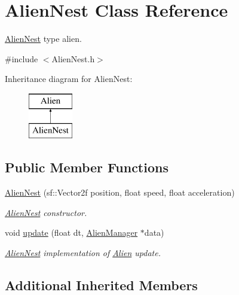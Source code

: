 \hypertarget{class_alien_nest}{}\section{Alien\+Nest Class Reference}
\label{class_alien_nest}


\hyperlink{class_alien_nest}{Alien\+Nest} type alien.  




{\ttfamily \#include $<$Alien\+Nest.\+h$>$}

Inheritance diagram for Alien\+Nest\+:\begin{figure}[H]
\begin{center}
\leavevmode
\includegraphics[height=2.000000cm]{class_alien_nest}
\end{center}
\end{figure}
\subsection*{Public Member Functions}
\begin{DoxyCompactItemize}
\item 
\mbox{\label{class_alien_nest_ad40eb25b1de5f065ef7d3cdd601847cb}} 
\hyperlink{class_alien_nest_ad40eb25b1de5f065ef7d3cdd601847cb}{Alien\+Nest} (sf\+::\+Vector2f position, float speed, float acceleration)
\begin{DoxyCompactList}\small\item\em \hyperlink{class_alien_nest}{Alien\+Nest} constructor. \end{DoxyCompactList}\item 
void \hyperlink{class_alien_nest_ac8d9fe5e35a8a049ae0be1b4f32bd403}{update} (float dt, \hyperlink{class_alien_manager}{Alien\+Manager} $\ast$data)
\begin{DoxyCompactList}\small\item\em \hyperlink{class_alien_nest}{Alien\+Nest} implementation of \hyperlink{class_alien}{Alien} update. \end{DoxyCompactList}\end{DoxyCompactItemize}
\subsection*{Additional Inherited Members}


